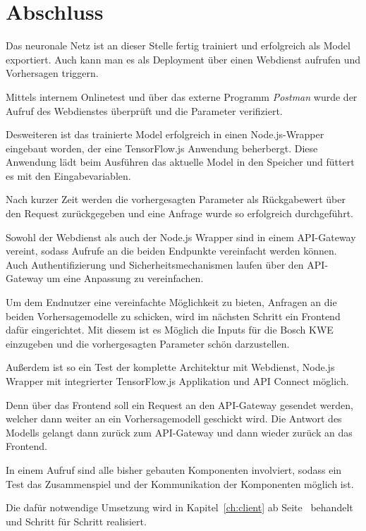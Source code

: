 \section{Abschluss}
Das neuronale Netz ist an dieser Stelle fertig trainiert und erfolgreich als Model exportiert. Auch kann man es als
Deployment über einen Webdienst aufrufen und Vorhersagen triggern.

Mittels internem Onlinetest und über das externe Programm \textit{Postman} wurde der Aufruf des Webdienstes überprüft
und die Parameter verifiziert.

Desweiteren ist das trainierte Model erfolgreich in einen Node.js-Wrapper eingebaut worden, der eine TensorFlow.js
Anwendung beherbergt. Diese Anwendung lädt beim Ausführen das aktuelle Model in den Speicher und füttert es mit den
Eingabevariablen.

Nach kurzer Zeit werden die vorhergesagten Parameter als Rückgabewert über den Request zurückgegeben und eine Anfrage
wurde so erfolgreich durchgeführt.

Sowohl der Webdienst als auch der Node.js Wrapper sind in einem API-Gateway vereint, sodass Aufrufe an die beiden
Endpunkte vereinfacht werden können. Auch Authentifizierung und Sicherheitsmechanismen laufen über den API-Gateway um
eine Anpassung zu vereinfachen.

Um dem Endnutzer eine vereinfachte Möglichkeit zu bieten, Anfragen an die beiden Vorhersagemodelle zu schicken, wird
im nächsten Schritt ein Frontend dafür eingerichtet. Mit diesem ist es Möglich die Inputs für die Bosch KWE einzugeben
und die vorhergesagten Parameter schön darzustellen.

Außerdem ist so ein Test der komplette Architektur mit Webdienst, Node.js Wrapper mit integrierter TensorFlow.js
Applikation und API Connect möglich.

Denn über das Frontend soll ein Request an den API-Gateway gesendet werden, welcher dann weiter an ein Vorhersagemodell
geschickt wird. Die Antwort des Modells gelangt dann zurück zum API-Gateway und dann wieder zurück an das Frontend.

In einem Aufruf sind alle bisher gebauten Komponenten involviert, sodass ein Test das Zusammenspiel und der
Kommunikation der Komponenten möglich ist.

Die dafür notwendige Umsetzung wird in Kapitel~\ref{ch:client} ab Seite~\pageref{ch:client} behandelt und Schritt für
Schritt realisiert.